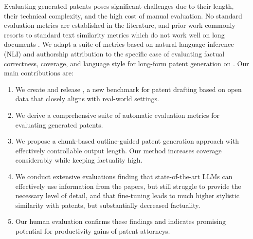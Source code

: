 Evaluating generated patents poses significant challenges due to their length, their technical complexity, and the high cost of manual evaluation.
No standard evaluation metrics are established in the literature, and prior work \cite{wangAutoPatentMultiAgentFramework2024,wangPatentformerNovelMethod2024} commonly resorts to standard text similarity metrics which do not work well on long documents \cite{lattimerFastAccurateFactual2023,queHelloBenchEvaluatingLong2024}. 
We adapt a suite of metrics based on natural language inference (NLI) and authorship attribution to the specific case of evaluating factual correctness, coverage, and language style for long-form patent generation on \DatasetName.
Our main contributions are:
\begin{enumerate}[label={(\arabic*)},itemsep=0mm,wide,labelindent=0pt,topsep=0pt,partopsep=0ex,parsep=0ex]
  \item We create and release \DatasetName, a new benchmark for patent drafting based on open data that closely aligns with real-world settings.

  \item We derive a comprehensive suite of automatic evaluation metrics for evaluating generated patents.

  \item We propose a chunk-based outline-guided patent generation approach with effectively controllable output length. 
  Our method increases coverage considerably while keeping factuality high.

  \item We conduct extensive evaluations finding that state-of-the-art LLMs can effectively use information from the papers, but still struggle to provide the necessary level of detail,
  and that fine-tuning leads to much higher stylistic similarity with patents, but substantially decreased factuality.

  \item Our human evaluation confirms these findings and indicates promising potential for productivity gains of patent attorneys.
\end{enumerate}

